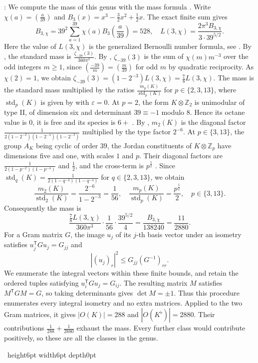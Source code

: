 \documentclass[leqno]{article}
\newcommand{\Z}{\ensuremath{\mathbb{Z}}}
\renewcommand{\leq}{\ensuremath{\leqslant}}
\renewcommand{\geq}{\ensuremath{\geqslant}}
\newcommand{\qed}{\hfill \vrule height6pt  width6pt depth0pt}
\newcommand{\ot}{\otimes}
\newcommand{\epsi}{\varepsilon}
\newenvironment{proof}[1][]{\noindent {\it Proof #1} : }{\hbox{~}\qed
\smallskip
}
\numberwithin{equation}{section}
\begin{document}
\begin{proof}
We compute the mass of this genus with the mass formula \cite[(2) and (3) p.~263]{CS88}. Write $\chi(a) = \left(\frac{a}{39}\right)$ and $B_3(x) = x^3-\frac32 x^2+\frac12 x$. The exact finite sum gives
\[
B_{3,\chi} = 39^2 \sum_{a=1}^{39} \chi(a) B_3\left(\frac a{39}\right) = 528,
\quad L(3,\chi) = \frac{2\pi^3 B_{3,\chi}}{3 \cdot 39^{5/2}}.
\]
Here the value of $L(3,\chi)$ is the generalized Bernoulli number formula, see \cite[Section 8 p.~267]{CS88}. By \cite[(7) p.~266 and Table 3 p.~267]{CS88}, the standard mass is $\frac{\zeta_{-39}(3)}{360\pi^3}$. By \cite[(9) p.~266]{CS88}, $\zeta_{-39}(3)$ is the sum of $\chi(m)m^{-3}$ over the odd integers $m \geq 1$, since $\left(\frac{-39}{m}\right) = \left(\frac{m}{39}\right)$ for odd $m$ by quadratic reciprocity. As $\chi(2) = 1$, we obtain $\zeta_{-39}(3) = (1-2^{-3})L(3,\chi) = \frac78 L(3,\chi)$. The mass is the standard mass multiplied by the ratios $\frac{m_p(K)}{\operatorname{std}_p(K)}$ for $p \in \{2,3,13\}$, where $\operatorname{std}_p(K)$ is given by \cite[(6) p.~266]{CS88} with $\epsi = 0$. At $p = 2$, the form $K\ot\Z_2$ is unimodular of type II, of dimension six and determinant $39 \equiv -1$ modulo $8$. Hence its octane value is $0$, it is free and its species is $6+$ \cite[Table 1 p.~264 and p.~265]{CS88}. By \cite[(3) p.~263 and (5) p.~265]{CS88}, $m_2(K)$ is the diagonal factor $\frac1{2(1-2^{-2})(1-2^{-4})(1-2^{-3})}$ multiplied by the type factor $2^{-6}$. At $p \in \{3,13\}$, the group $A_K$ being cyclic of order $39$, the Jordan constituents of $K\ot\Z_p$ have dimensions five and one, with scales $1$ and $p$. Their diagonal factors are $\frac1{2(1-p^{-2})(1-p^{-4})}$ and $\frac12$, and the cross-term is $p^{\frac52}$ \cite[(3) p.~263 and (5) p.~265]{CS88}. Since $\operatorname{std}_q(K) = \frac1{2(1-q^{-2})(1-q^{-4})}$ for $q \in \{2,3,13\}$, we obtain
\[
\frac{m_2(K)}{\operatorname{std}_2(K)} = \frac{2^{-6}}{1-2^{-3}} = \frac1{56},
\quad
\frac{m_p(K)}{\operatorname{std}_p(K)} = \frac{p^{\frac52}}{2},
\quad p \in \{3,13\}.
\]
Consequently the mass is
\[
\frac{\frac78 L(3,\chi)}{360\pi^3} \cdot \frac1{56} \cdot \frac{39^{5/2}}4 = \frac{B_{3,\chi}}{138240} = \frac{11}{2880}.
\]
For a Gram matrix $G$, the image $u_j$ of its $j$-th basis vector under an isometry satisfies $u_j^{\mathsf T}G u_j = G_{jj}$ and
\[
|(u_j)_r|^2 \leq G_{jj}(G^{-1})_{rr}.
\]
We enumerate the integral vectors within these finite bounds, and retain the ordered tuples satisfying $u_i^{\mathsf T}G u_j = G_{ij}$. The resulting matrix $M$ satisfies $M^{\mathsf T}GM = G$, so taking determinants gives $\det M = \pm1$. Thus this procedure enumerates every integral isometry and no extra matrices. Applied to the two Gram matrices, it gives $|O(K)| = 288$ and $|O(K^\flat)| = 2880$. Their contributions $\frac1{288}+\frac1{2880}$ exhaust the mass. Every further class would contribute positively, so these are all the classes in the genus.


\end{proof}
\end{document}
